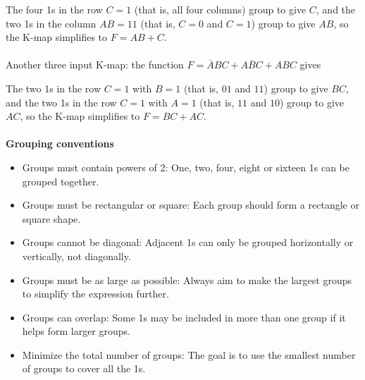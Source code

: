 The four 1s in the row $C=1$ (that is, all four columns) group to give $C$, and the two 1s in the column $AB=11$ (that is, $C=0$ and $C=1$) group to give $AB$, so the K-map simplifies to $F=AB+C$.\\\\
Another three input K-map: the function $F=\overline{A}BC+A\overline{B}C+ABC$ gives
\begin{center}
\end{center}
The two 1s in the row $C=1$ with $B=1$ (that is, $01$ and $11$) group to give $BC$, and the two 1s in the row $C=1$ with $A=1$ (that is, $11$ and $10$) group to give $AC$, so the K-map simplifies to $F=BC+AC$.\\\\
\textbf{Grouping conventions}
\begin{itemize}
    \item Groups must contain powers of 2: One, two, four, eight or sixteen 1s can be 
grouped together.
	\item Groups must be rectangular or square: Each group should form a rectangle or 
square shape. 
\item Groups cannot be diagonal: Adjacent 1s can only be grouped horizontally or vertically, 
not diagonally. 
\item Groups must be as large as possible: Always aim to make the largest groups to simplify the expression further. 
\item Groups can overlap: Some 1s may be included in more than one group if it helps form 
larger groups. 
\item Minimize the total number of groups: The goal is to use the smallest number of groups to cover all the 1s. 
    \end{itemize}
